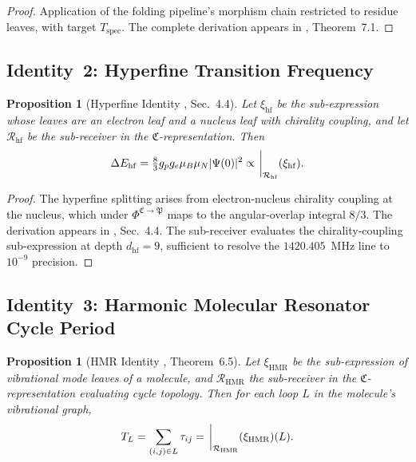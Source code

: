 \documentclass[11pt,twocolumn,a4paper]{article}
\newtheorem{proposition}[theorem]{Proposition}
\theoremstyle{definition}
\theoremstyle{remark}
\newcommand{\Recv}{\mathcal{R}}
\newcommand{\Cat}{\mathfrak{C}}
\newcommand{\Part}{\mathfrak{P}}
\newcommand{\Sexp}{\xi}
\begin{document}
\begin{proof}
Application of the folding pipeline's morphism chain restricted to residue leaves, with target $T_{\mathrm{spec}}$. The complete derivation appears in \citep{sachikonye2025fold}, Theorem~7.1.
\end{proof}

\subsection{Identity~2: Hyperfine Transition Frequency}

\begin{proposition}[Hyperfine Identity \citep{sachikonye2025_hyperfine}, Sec.~4.4]
\label{prop:id_hyperfine}
Let $\Sexp_{\mathrm{hf}}$ be the sub-expression whose leaves are an electron leaf and a nucleus leaf with chirality coupling, and let $\Recv_{\mathrm{hf}}$ be the sub-receiver in the $\Cat$-representation. Then
\begin{equation}
\Delta E_{\mathrm{hf}} = \tfrac{8}{3} g_p g_e \mu_B \mu_N |\Psi(0)|^2 \propto \eval_{\Recv_{\mathrm{hf}}}(\Sexp_{\mathrm{hf}}).
\end{equation}
\end{proposition}

\begin{proof}
The hyperfine splitting arises from electron-nucleus chirality coupling at the nucleus, which under $\Phi^{\Cat \to \Part}$ maps to the angular-overlap integral $8/3$. The derivation appears in \citep{sachikonye2025_hyperfine}, Sec.~4.4. The sub-receiver evaluates the chirality-coupling sub-expression at depth $d_{\mathrm{hf}} = 9$, sufficient to resolve the $1420.405$~MHz line to $10^{-9}$ precision.
\end{proof}

\subsection{Identity~3: Harmonic Molecular Resonator Cycle Period}

\begin{proposition}[HMR Identity \citep{sachikonye2025_hmr}, Theorem~6.5]
\label{prop:id_hmr}
Let $\Sexp_{\mathrm{HMR}}$ be the sub-expression of vibrational mode leaves of a molecule, and $\Recv_{\mathrm{HMR}}$ the sub-receiver in the $\Cat$-representation evaluating cycle topology. Then for each loop $L$ in the molecule's vibrational graph,
\begin{equation}
T_L = \sum_{(i,j) \in L} \tau_{ij} = \eval_{\Recv_{\mathrm{HMR}}}(\Sexp_{\mathrm{HMR}})(L).
\end{equation}
\end{proposition}
\end{document}
